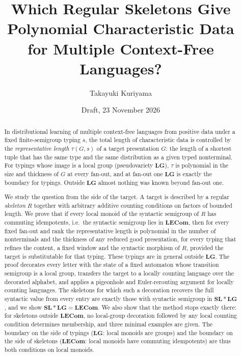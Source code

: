 \documentclass[11pt]{article}
\title{Which Regular Skeletons Give Polynomial Characteristic Data\\
for Multiple Context-Free Languages?}
\author{Takayuki Kuriyama}
\date{Draft, 23 November 2026}
\numberwithin{equation}{section}
\theoremstyle{plain}
\theoremstyle{definition}
\theoremstyle{remark}
\theoremstyle{plain}
\newcommand{\LG}{\mathbf{LG}}
\newcommand{\SL}{\mathbf{SL}}
\newcommand{\LECom}{\mathbf{L}\mathbf{ECom}}
\begin{document}
\maketitle

\begin{abstract}
In distributional learning of multiple context-free languages from positive
data under a fixed finite-semigroup typing $s$, the total length of
characteristic data is controlled by the \emph{representative length}
$\tau(G,s)$ of a target presentation $G$: the length of a shortest tuple that
has the same type and the same distribution as a given typed nonterminal.
For typings whose image is a local group (pseudovariety $\LG$), $\tau$ is
polynomial in the size and thickness of $G$ at every fan-out, and at fan-out
one $\LG$ is exactly the boundary for typings.  Outside $\LG$ almost nothing
was known beyond fan-out one.

We study the question from the side of the target.  A target is described by
a regular \emph{skeleton} $R$ together with arbitrary additive counting
conditions on factors of bounded length.  We prove that if every local monoid
of the syntactic semigroup of $R$ has commuting idempotents, i.e.\ the
syntactic semigroup lies in $\LECom$, then for every fixed fan-out and rank
the representative length is polynomial in the number of nonterminals and the
thickness of any reduced good presentation, for every typing that refines the
content, a fixed window and the syntactic morphism of $R$, provided the target
is substitutable for that typing.  These typings are in general outside $\LG$.
The proof decorates every letter with the state of a fixed automaton whose
transition semigroup is a local group, transfers the target to a locally
counting language over the decorated alphabet, and applies a pigeonhole and
Euler-rerouting argument for locally counting languages.  The skeletons for
which such a decoration recovers the full syntactic value from every entry
are exactly those with syntactic semigroup in $\SL*\LG$, and we show
$\SL*\LG=\LECom$.  We also show that the method stops exactly there: for
skeletons outside $\LECom$, no local-group decoration followed by any local
counting condition determines membership, and three minimal examples are
given.  The boundary on the side of typings ($\LG$: local monoids are groups)
and the boundary on the side of skeletons ($\LECom$: local monoids have
commuting idempotents) are thus both conditions on local monoids.
\end{abstract}
\end{document}
